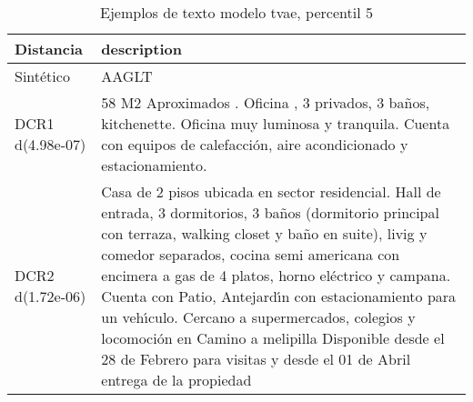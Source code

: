 \begin{table}[H]
\centering
\fontsize{10}{14}\selectfont
\caption{Ejemplos de texto modelo tvae, percentil 5}
\label{table-example-economicos-a-3-tvae-5p-text}
\begin{tabular}{|l|m{35em}|}
\hline
\rowcolor[gray]{0.8}
Distancia & description \\
\hline Sintético & AAGLT \\
\hline DCR1 d(4.98e-07) & 58 M2 Aproximados . Oficina , 3 privados, 3 ba\~nos, kitchenette. Oficina muy luminosa y tranquila. Cuenta con equipos de calefacci\'on, aire acondicionado y estacionamiento. \\
\hline DCR2 d(1.72e-06) & Casa de 2 pisos ubicada en sector residencial. Hall de entrada, 3 dormitorios, 3 ba\~nos (dormitorio principal con terraza, walking closet y ba\~no en suite), livig y comedor separados, cocina semi americana con encimera a gas de 4 platos, horno el\'ectrico y campana.  Cuenta con Patio, Antejard{\'\i}n con estacionamiento para un veh{\'\i}culo.  Cercano a supermercados, colegios y locomoci\'on en Camino a melipilla Disponible desde el 28 de Febrero para visitas y desde el 01 de Abril entrega de la propiedad \\
\hline
\end{tabular}
\end{table}

